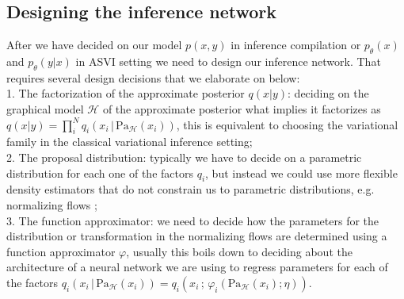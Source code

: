 \documentclass[12pt]{article}
\begin{document}
% 
% 




\subsection{Designing the inference network}
\label{sec:design}

After we have decided on our model $p(x,y)$ in inference compilation or $p_\theta(x)$ and $p_\theta(y|x)$ in ASVI setting we need to design our inference network. 
That requires several design decisions that we elaborate on below:\\
1. The factorization of the approximate posterior $q(x|y)$: deciding on the graphical model $\mathcal{H}$ of the approximate posterior what implies it factorizes as $q(x|y)=\prod^N_iq_i(x_i\,|\,\text{Pa}_\mathcal{H}(x_i))$, this is equivalent to choosing the variational family in the classical variational inference setting;\\
2. The proposal distribution: typically we have to decide on a parametric distribution for each one of the factors $q_i$, but instead we could use more flexible density estimators that do not constrain us to parametric distributions, e.g. normalizing flows \citep{RezendeMohamed2015}; \\
3. The function approximator: we need to decide how the parameters for the distribution or transformation in the normalizing flows are determined using a function approximator $\varphi$, usually this boils down to deciding about the architecture of a neural network we are using to regress parameters for each of the factors 
$q_i(x_i\,|\,\text{Pa}_\mathcal{H}(x_i)) = q_i(x_i\,;\,\varphi_i(\text{Pa}_\mathcal{H}(x_i); \eta))$.\\
\end{document}
